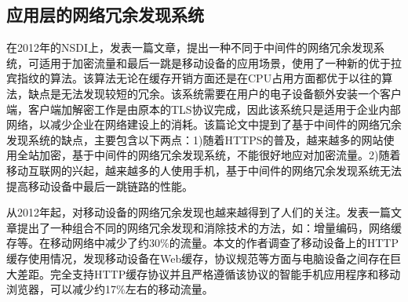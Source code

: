 \subsection{应用层的网络冗余发现系统}

在2012年的NSDI上，\cite{Aggarwal}发表一篇文章，提出一种不同于中间件的网络冗余发现系统，可适用于加密流量和最后一跳是移动设备的应用场景，使用了一种新的优于拉宾指纹的算法。该算法无论在缓存开销方面还是在CPU占用方面都优于以往的算法，缺点是无法发现较短的冗余。该系统需要在用户的电子设备额外安装一个客户端，客户端加解密工作是由原本的TLS协议完成，因此该系统只是适用于企业内部网络，以减少企业在网络建设上的消耗。该篇论文中提到了基于中间件的网络冗余发现系统的缺点，主要包含以下两点：1)随着HTTPS的普及，越来越多的网站使用全站加密，基于中间件的网络冗余发现系统，不能很好地应对加密流量。2)随着移动互联网的兴起，越来越多的人使用手机，基于中间件的网络冗余发现系统无法提高移动设备中最后一跳链路的性能。

从2012年起，对移动设备的网络冗余发现也越来越得到了人们的关注。\cite{Feng2013How}发表一篇文章提出了一种组合不同的网络冗余发现和消除技术的方法，如：增量编码，网络缓存等。在移动网络中减少了约30\%的流量。本文的作者调查了移动设备上的HTTP缓存使用情况，发现移动设备在Web缓存，协议规范等方面与电脑设备之间存在巨大差距。完全支持HTTP缓存协议并且严格遵循该协议的智能手机应用程序和移动浏览器，可以减少约17\%左右的移动流量。

